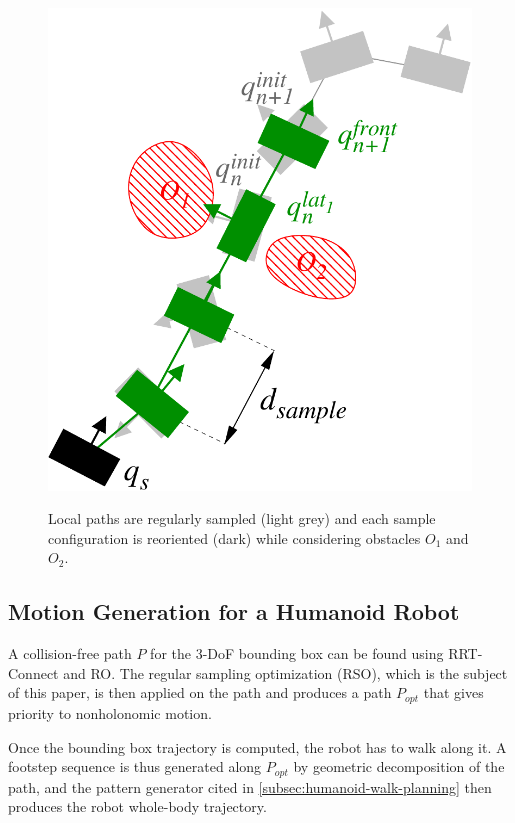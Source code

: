 \begin{figure}
  \centering
      {\includegraphics[width = \linewidth]{src/chap1-path-optimization/hash-direct-path.pdf}}
      \caption{Local paths are regularly sampled (light grey) and each
        sample configuration is reoriented (dark) while considering
        obstacles $O_1$ and $O_2$.}
      \label{fig:hash-direct-path}
\end{figure}

\subsection{Motion Generation for a Humanoid Robot}

A collision-free path $P$ for the 3-DoF bounding box can be found
using RRT-Connect and RO. The regular sampling optimization (RSO),
which is the subject of this paper, is then applied on the path and
produces a path $P_{opt}$ that gives priority to nonholonomic motion.

Once the bounding box trajectory is computed, the robot has to walk
along it. A footstep sequence is thus generated along $P_{opt}$ by
geometric decomposition of the path, and the pattern generator cited
in \autoref{subsec:humanoid-walk-planning} then produces the robot
whole-body trajectory.

